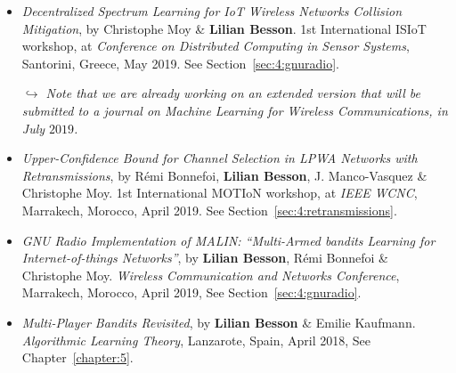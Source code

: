 \begin{itemize}
\item
    \emph{Decentralized Spectrum Learning for IoT Wireless Networks Collision Mitigation},
    by Christophe Moy \& \textbf{Lilian Besson}.
    1st International ISIoT workshop,
    at \emph{Conference on Distributed Computing in Sensor Systems},
    Santorini, Greece, May 2019.
    See Section~\ref{sec:4:gnuradio}.
    \cite{MoyBesson2019}

    \emph{$\hookrightarrow$ Note that we are already working on an extended version that will be submitted to a journal on Machine Learning for Wireless Communications, in July $2019$.}

\item
    \emph{Upper-Confidence Bound for Channel Selection in LPWA Networks with Retransmissions},
    by Rémi Bonnefoi, \textbf{Lilian Besson}, J. Manco-Vasquez \& Christophe Moy.
    1st International MOTIoN workshop,
    at \emph{IEEE WCNC}, Marrakech, Morocco, April 2019.
    See Section~\ref{sec:4:retransmissions}.
    \cite{Bonnefoi2019WCNC}

\item
    \emph{GNU Radio Implementation of MALIN: ``Multi-Armed bandits Learning for Internet-of-things Networks''},
    by \textbf{Lilian Besson}, Rémi Bonnefoi \& Christophe Moy.
    \emph{Wireless Communication and Networks Conference},
    Marrakech, Morocco, April 2019,
    See Section~\ref{sec:4:gnuradio}.
    \cite{Besson2019WCNC}

\item
    \emph{Multi-Player Bandits Revisited},
    by \textbf{Lilian Besson} \& Emilie Kaufmann.
    \emph{Algorithmic Learning Theory},
    Lanzarote, Spain, April 2018,
    See Chapter~\ref{chapter:5}.
    \cite{Besson2018ALT}


\end{itemize}
